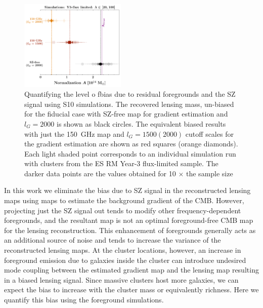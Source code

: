 \begin{figure}
\centering

\includegraphics[width=0.45\textwidth, keepaspectratio]{figs/tSZ_bias_checks_sehgal_sims.pdf}
\caption{ Quantifying the level o fbias due to residual foregrounds and the SZ signal using S10 simulations. The recovered lensing mass, un-biased for the fiducial case with SZ-free map for gradient estimation and $l_{G} = 2000$ is shown as black circles. The equivalent biased results with just the 150\, GHz map and $l_{G} = 1500 (2000)$ cutoff scales for the gradient estimation are shown as red squares (orange diamonds). Each light shaded point corresponds to an individual simulation run with clusters from the ES RM Year-3 flux-limited sample. The darker data points are the values obtained for 10 $\times$ the sample size}
\label{fig_QE_sehgal_sims}
\end{figure}

In this work we eliminate the bias due to SZ signal in the reconstructed lensing maps using  maps to estimate the background gradient of the CMB. 
However, projecting just the SZ signal out tends to modify other frequency-dependent foregrounds, and the resultant map is not an optimal foreground-free CMB map for the lensing reconstruction. 
This enhancement of foregrounds generally acts as an additional source of noise and tends to increase the variance of the reconstructed lensing maps. 
At the cluster locations, however, an increase in foreground emission due to galaxies inside the cluster can introduce undesired mode coupling between the estimated gradient map and the lensing map resulting in a biased lensing signal. 
Since massive clusters host more galaxies, we can expect the bias to increase with the cluster mass or equivalently richness. 
Here we quantify this bias using the \cite{sehgal10} foreground simulations.

